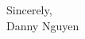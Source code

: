 \documentclass[letterpaper,11pt]{article}
\begin{document}
Sincerely, \\
\vspace{40pt} %
Danny Nguyen

\end{document}
